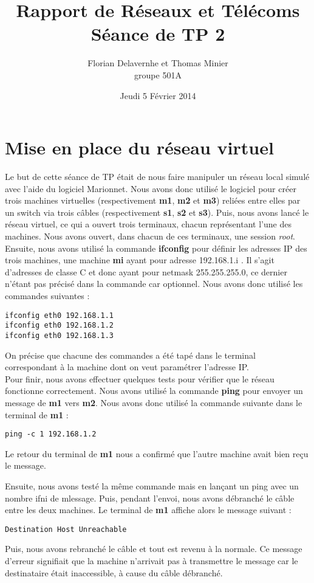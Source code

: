 \documentclass{article}
\title{Rapport de Réseaux et Télécoms \\ Séance de TP 2}
\author{Florian Delavernhe et Thomas Minier \\ groupe 501A}
\date{Jeudi 5 Février 2014}
\begin{document}
\maketitle
\vspace{5cm}
\tableofcontents
\newpage

\section{Mise en place du réseau virtuel}

Le but de cette séance de TP était de nous faire manipuler un réseau local simulé avec l'aide du logiciel Marionnet. Nous avons donc utilisé le logiciel pour créer trois machines virtuelles (respectivement \textbf{m1}, \textbf{m2} et \textbf{m3}) reliées entre elles par un switch via trois câbles (respectivement \textbf{s1}, \textbf{s2} et \textbf{s3}). Puis, nous avons lancé le réseau virtuel, ce qui a ouvert trois terminaux, chacun représentant l'une des machines. Nous avons ouvert, dans chacun de ces terminaux, une session \textit{root}. \\

Ensuite, nous avons utilisé la commande \textbf{ifconfig} pour définir les adresses IP des trois machines, une machine \textbf{mi} ayant pour adresse 192.168.1.i . Il s'agit d'adresses de classe C et donc ayant pour netmask 255.255.255.0, ce dernier n'étant pas précisé dans la commande car optionnel. Nous avons donc utilisé les commandes suivantes :
\begin{verbatim}
ifconfig eth0 192.168.1.1
ifconfig eth0 192.168.1.2
ifconfig eth0 192.168.1.3
\end{verbatim}
On précise que chacune des commandes a été tapé dans le terminal correspondant à la machine dont on veut paramétrer l'adresse IP. \\

Pour finir, nous avons effectuer quelques tests pour vérifier que le réseau fonctionne correctement. Nous avons utilisé la commande \textbf{ping} pour envoyer un message de \textbf{m1} vers \textbf{m2}. Nous avons donc utilisé la commande suivante dans le terminal de \textbf{m1} :
\begin{verbatim}
ping -c 1 192.168.1.2
\end{verbatim}
Le retour du terminal de \textbf{m1} nous a confirmé que l'autre machine avait bien reçu le message.

Ensuite, nous avons testé la même commande mais en lançant un ping avec un nombre ifni de mlessage. Puis, pendant l'envoi, nous avons débranché le câble entre les deux machines. Le terminal de \textbf{m1} affiche alors le message suivant :
\begin{verbatim}
Destination Host Unreachable
\end{verbatim}
Puis, nous avons rebranché le câble et tout est revenu à la normale. Ce message d'erreur signifiait que la machine n'arrivait pas à transmettre le message car le destinataire était inaccessible, à cause du câble débranché.
\end{document}
